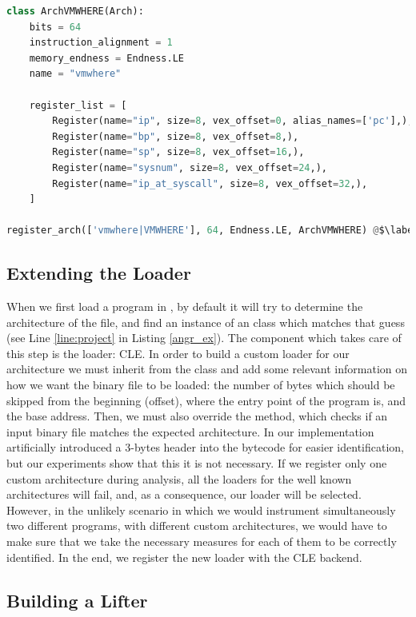 \begin{lstlisting}[language=python, label={lst:angr_arch}, caption={TODO}]
class ArchVMWHERE(Arch):
    bits = 64
    instruction_alignment = 1
    memory_endness = Endness.LE
    name = "vmwhere"

    register_list = [
        Register(name="ip", size=8, vex_offset=0, alias_names=['pc'],),
        Register(name="bp", size=8, vex_offset=8,),
        Register(name="sp", size=8, vex_offset=16,),
        Register(name="sysnum", size=8, vex_offset=24,),
        Register(name="ip_at_syscall", size=8, vex_offset=32,),
    ]

register_arch(['vmwhere|VMWHERE'], 64, Endness.LE, ArchVMWHERE) @$\label{line:reg_arch}$@
\end{lstlisting}

\subsection{Extending the Loader}

When we first load a program in , by default it will try to determine the architecture of the file, and find an instance of an  class which matches that guess (see Line \ref{line:project} in Listing \ref{angr_ex}). The component which takes care of this step is the loader: \gls{CLE}. In order to build a custom loader for our architecture we must inherit from the  class and add some relevant information on how we want the binary file to be loaded: the number of bytes which should be skipped from the beginning (offset), where the entry point of the program is, and the base address. Then, we must also override the  method, which checks if an input binary file matches the expected architecture. In our implementation artificially introduced a 3-bytes header into the bytecode for easier identification, but our experiments show that this it is not necessary. If we register only one custom architecture during analysis, all the loaders for the well known architectures will fail, and, as a consequence, our loader will be selected. However, in the unlikely scenario in which we would instrument simultaneously two different programs, with different custom architectures, we would have to make sure that we take the necessary measures for each of them to be correctly identified. In the end, we register the new loader with the \gls{CLE} backend.

\subsection{Building a Lifter}

